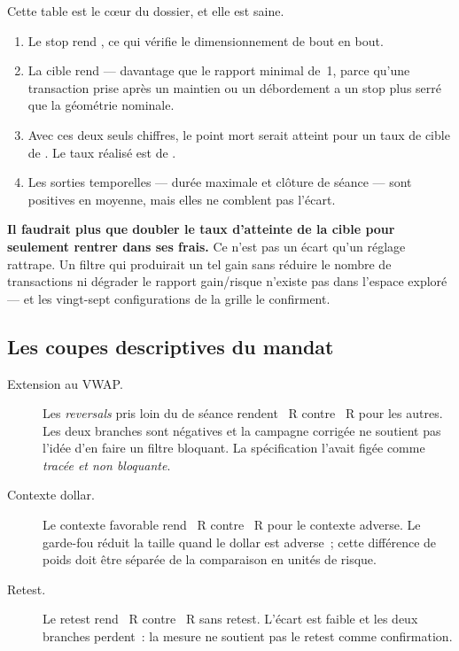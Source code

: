 Cette table est le cœur du dossier, et elle est saine.

\begin{enumerate}
  \item Le stop rend , ce qui vérifie le
  dimensionnement de bout en bout.
  \item La cible rend  --- davantage que le rapport
  minimal de~1, parce qu'une transaction prise après un maintien ou un
  débordement a un stop plus serré que la géométrie nominale.
  \item Avec ces deux seuls chiffres, le point mort serait atteint pour un
  taux de cible de \metric{\XTenBreakevenTargetRate}. Le taux réalisé est de
  \metric{\XTenTargetShare}.
  \item Les sorties temporelles --- durée maximale et clôture de séance ---
  sont positives en moyenne, mais elles ne comblent pas l'écart.
\end{enumerate}

\begin{insightbox}
\textbf{Il faudrait plus que doubler le taux d'atteinte de la cible pour
seulement rentrer dans ses frais.} Ce n'est pas un écart qu'un réglage
rattrape. Un filtre qui produirait un tel gain sans réduire le nombre de
transactions ni dégrader le rapport gain/risque n'existe pas dans l'espace
exploré --- et les vingt-sept configurations de la grille le confirment.
\end{insightbox}

\subsection{Les coupes descriptives du mandat}



\begin{description}
  \item[Extension au VWAP.] Les \emph{reversals} pris loin du  de
  séance rendent \XTenExtendedR{}~R contre \XTenNotExtendedR{}~R pour les
  autres. Les deux branches sont négatives et la campagne corrigée ne soutient
  pas l'idée d'en faire un filtre bloquant. La spécification l'avait figée
  comme \emph{tracée et non bloquante}.
  \item[Contexte dollar.] Le contexte favorable rend
  \XTenDxyFavourableR{}~R contre \XTenDxyAdverseR{}~R pour le contexte adverse.
  Le garde-fou réduit la taille quand le dollar est adverse~; cette différence
  de poids doit être séparée de la comparaison en unités de risque.
  \item[Retest.] Le retest rend \XTenRetestR{}~R contre
  \XTenNoRetestR{}~R sans retest. L'écart est faible et les deux branches
  perdent~: la mesure ne soutient pas le retest comme confirmation.
\end{description}

